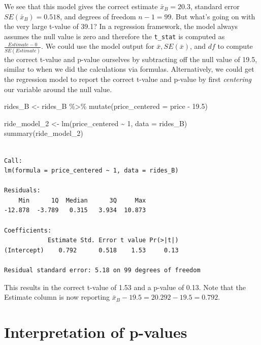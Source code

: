 \documentclass[
  letterpaper,
  DIV=11,
  numbers=noendperiod]{scrreprt}
\newenvironment{Shaded}{\begin{snugshade}}{\end{snugshade}}
\newcommand{\AttributeTok}[1]{\textcolor[rgb]{0.40,0.45,0.13}{#1}}
\newcommand{\DecValTok}[1]{\textcolor[rgb]{0.68,0.00,0.00}{#1}}
\newcommand{\FloatTok}[1]{\textcolor[rgb]{0.68,0.00,0.00}{#1}}
\newcommand{\FunctionTok}[1]{\textcolor[rgb]{0.28,0.35,0.67}{#1}}
\newcommand{\NormalTok}[1]{\textcolor[rgb]{0.00,0.23,0.31}{#1}}
\newcommand{\OtherTok}[1]{\textcolor[rgb]{0.00,0.23,0.31}{#1}}
\newcommand{\SpecialCharTok}[1]{\textcolor[rgb]{0.37,0.37,0.37}{#1}}
\theoremstyle{definition}
\theoremstyle{remark}
\begin{document}
We see that this model gives the correct estimate \(\bar{x}_B = 20.3\),
standard error \(SE(\bar{x}_B) = 0.518\), and degrees of freedom
\(n - 1 = 99\). But what's going on with the very large t-value of 39.1?
In a regression framework, the model always assumes the null value is
zero and therefore the \texttt{t\_stat} is computed as
\(\frac{Estimate - 0}{SE(Estimate)}\). We could use the model output for
\(\bar{x}, SE(\bar{x})\), and \(df\) to compute the correct t-value and
p-value ourselves by subtracting off the null value of 19.5, similar to
when we did the calculations via formulas. Alternatively, we could get
the regression model to report the correct t-value and p-value by first
\emph{centering} our variable around the null value.

\begin{Shaded}
\begin{Highlighting}[]
\NormalTok{rides\_B }\OtherTok{\textless{}{-}}\NormalTok{ rides\_B }\SpecialCharTok{\%\textgreater{}\%} 
  \FunctionTok{mutate}\NormalTok{(}\AttributeTok{price\_centered =}\NormalTok{ price }\SpecialCharTok{{-}} \FloatTok{19.5}\NormalTok{)}

\NormalTok{ride\_model\_2 }\OtherTok{\textless{}{-}} \FunctionTok{lm}\NormalTok{(price\_centered }\SpecialCharTok{\textasciitilde{}} \DecValTok{1}\NormalTok{, }\AttributeTok{data =}\NormalTok{ rides\_B)}
\FunctionTok{summary}\NormalTok{(ride\_model\_2)}
\end{Highlighting}
\end{Shaded}

\begin{verbatim}

Call:
lm(formula = price_centered ~ 1, data = rides_B)

Residuals:
    Min      1Q  Median      3Q     Max 
-12.878  -3.789   0.315   3.934  10.873 

Coefficients:
            Estimate Std. Error t value Pr(>|t|)
(Intercept)    0.792      0.518    1.53     0.13

Residual standard error: 5.18 on 99 degrees of freedom
\end{verbatim}

This results in the correct t-value of 1.53 and a p-value of 0.13. Note
that the Estimate column is now reporting
\(\bar{x}_B - 19.5 = 20.292 - 19.5 = 0.792\).

\hypertarget{interpretation-of-p-values}{%
\section{Interpretation of p-values}\label{interpretation-of-p-values}}
\end{document}
